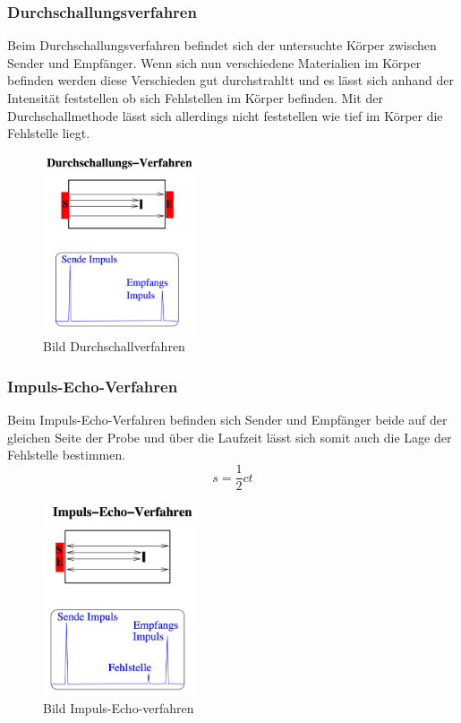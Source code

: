 \subsubsection{Durchschallungsverfahren}
Beim Durchschallungsverfahren befindet sich der untersuchte Körper zwischen Sender und Empfänger.
Wenn sich nun verschiedene Materialien im Körper befinden werden diese Verschieden gut durchstrahltt und es lässt sich anhand der Intensität feststellen ob sich Fehlstellen im Körper befinden.
Mit der Durchschallmethode lässt sich allerdings nicht feststellen wie tief im Körper die Fehlstelle liegt.
\begin{figure}[H]
    \centering
    \includegraphics[width=0.4\textwidth]{bilder/Durchschallungs-Verfahren.png}
    \caption{Bild Durchschallverfahren}
\end{figure}
\subsubsection{Impuls-Echo-Verfahren}
Beim Impuls-Echo-Verfahren befinden sich Sender und Empfänger beide auf der gleichen Seite der Probe und über die Laufzeit lässt sich somit auch die Lage der Fehlstelle bestimmen.
\begin{equation}
    s = \frac{1}{2}ct \nonumber
\end{equation}
\begin{figure}[H]
    \centering
    \includegraphics[width=0.4\textwidth]{bilder/Impuls-Echo-Verfahren.png}
    \caption{Bild Impuls-Echo-verfahren}
\end{figure}